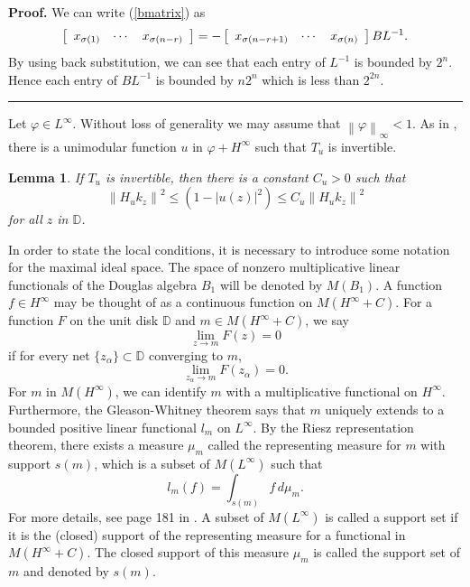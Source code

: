 \documentclass{article}%
\newtheorem{lemma}[theorem]{Lemma}
\newenvironment{proof}[1][Proof]{\noindent\textbf{#1.} }{\ \rule{0.5em}{0.5em}}
\begin{document}
\begin{proof}
We can write (\ref{bmatrix}) as%
\[
\left[
\begin{array}
[c]{ccc}%
x_{\sigma(1)} & \cdots & x_{\sigma(n-r)}%
\end{array}
\right]  =-\left[
\begin{array}
[c]{ccc}%
x_{\sigma(n-r+1)} & \cdots & x_{\sigma(n)}%
\end{array}
\right]  BL^{-1}.
\]
By using back substitution, we can see that each entry of $L^{-1}$ is bounded
by $2^{n}.$ Hence each entry of $BL^{-1}$ is bounded by $n2^{n}$ which is less
than $2^{2n}.$
\end{proof}

Let $\varphi\in L^{\infty}.$ Without loss of generality we may assume that
$\left\|  \varphi\right\|  _{\infty}<1$. As in \cite{Volberg}, there is a
unimodular function $u$ in $\varphi+H^{\infty}$ such that $T_{u}$ is invertible.

\begin{lemma}
\cite[Lemma 3]{Zheng}\label{Lemma3 Zheng} If $T_{u}$ is invertible, then there
is a constant $C_{u}>0$ such that
\[
\left\|  H_{u} k_{z}\right\|  ^{2} \leqslant\left(  1-|u(z)|^{2}\right)
\leqslant C_{u}\left\|  H_{u} k_{z}\right\|  ^{2}
\]
for all $z$ in $\mathbb{D}$.
\end{lemma}

In order to state the local conditions, it is necessary to introduce some
notation for the maximal ideal space. The space of nonzero multiplicative
linear functionals of the Douglas algebra $B_{1}$ will be denoted by
$M(B_{1})$. A function $f \in H^{\infty} $ may be thought of as a continuous
function on $M\left(  H^{\infty}+C\right)  $. For a function $F $ on the unit
disk $\mathbb{D}$ and $m \in M(H^{\infty}+ C) $, we say
\[
\lim_{z \to m} F(z) = 0
\]
if for every net $\{z_{\alpha}\} \subset\mathbb{D}$ converging to $m $,
\[
\lim_{z_{\alpha}\to m} F(z_{\alpha}) = 0.
\]
For $m$ in $M\left(  H^{\infty}\right)  $, we can identify $m$ with a
multiplicative functional on $H^{\infty}$. Furthermore, the Gleason-Whitney
theorem \cite{Douglas} says that $m$ uniquely extends to a bounded positive
linear functional $l_{m}$ on $L^{\infty}$. By the Riesz representation
theorem, there exists a measure $\mu_{m}$ called the representing measure for
$m$ with support $s(m)$, which is a subset of $M\left(  L^{\infty}\right)  $
such that
\begin{equation}
\label{support}l_{m}(f) = \int_{s(m)} f \, d\mu_{m}.
\end{equation}
For more details, see page 181 in \cite{Hoffman}. A subset of $M\left(
L^{\infty}\right)  $ is called a support set if it is the (closed) support of
the representing measure for a functional in $M\left(  H^{\infty}+C\right)  $.
The closed support of this measure $\mu_{m}$ is called the support set of $m$
and denoted by $s(m)$.
\end{document}
